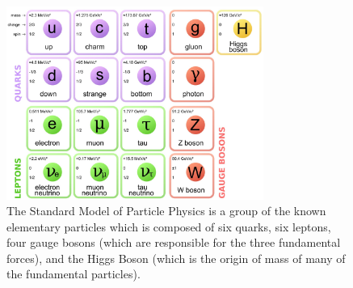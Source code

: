 \begin{figure}
    \centering
    \includegraphics[width=0.75\textwidth]{figs/motivation/SM.jpg}
    \caption{The Standard Model of Particle Physics is a group of the known elementary particles which is composed of six quarks, six leptons, four gauge bosons (which are responsible for the three fundamental forces), and the Higgs Boson (which is the origin of mass of many of the fundamental particles).}
    \label{fig:sm}
\end{figure}





